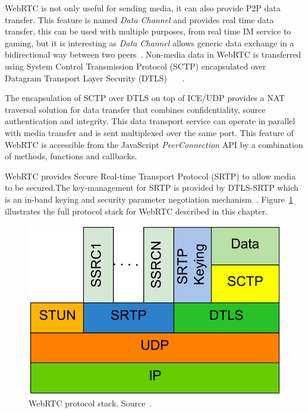 WebRTC is not only useful for sending media, it can also provide P2P data transfer. This feature is named {\it Data Channel} and provides real time data transfer, this can be used with multiple purposes, from real time IM service to gaming, but it is interesting as {\it Data Channel} allows generic data exchange in a bidirectional way between two peers~\cite{datachanIETF}. Non-media data in WebRTC is transferred using System Control Transmission Protocol (SCTP)  encapsulated over Datagram Transport Layer Security (DTLS) ~\cite{sctpIETF}~\cite{dtlsIETF}~\cite{datachanIETF}. 

The encapsulation of SCTP over DTLS on top of ICE/UDP provides a NAT traversal solution for data transfer that combines confidentiality, source authentication and integrity. This data transport service can operate in parallel with media transfer and is sent multiplexed over the same port. This feature of WebRTC is accessible from the JavaScript {\it PeerConnection} API by a combination of methods, functions and callbacks. 


WebRTC provides Secure Real-time Transport Protocol (SRTP)  to allow media to be secured.The key-management for SRTP is provided by DTLS-SRTP which is an in-band keying and security parameter negotiation mechanism~\cite{salvatore}. Figure~\ref{fig:stack} illustrates the full protocol stack for WebRTC described in this chapter.

 \begin{figure}[h]
  \centering
    \includegraphics[scale=0.8]{./figures/protocolstack.pdf}
      \caption[WebRTC protocol stack. Source~\cite{salvatore}]{WebRTC protocol stack. Source~\cite{salvatore}.}
	\label{fig:stack}
\end{figure}

